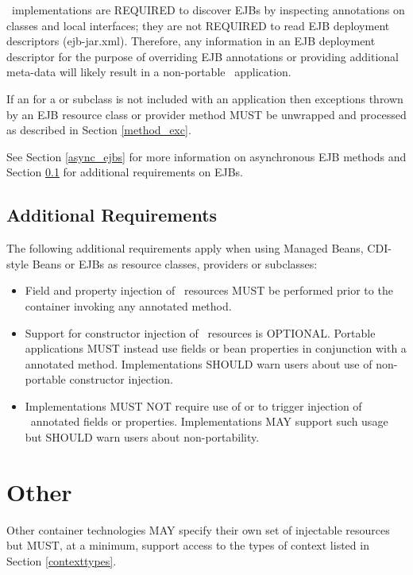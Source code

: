 \jaxrs\ implementations are REQUIRED to discover EJBs by inspecting annotations on classes and local interfaces; they are not REQUIRED to read EJB deployment descriptors (ejb-jar.xml). Therefore, any information in an EJB deployment descriptor for the purpose of overriding EJB annotations or providing additional meta-data will likely result in a non-portable \jaxrs\ application. 

If an  for a  or subclass is not included with an application then exceptions thrown by an EJB resource class or provider method MUST be unwrapped and processed as described in Section \ref{method_exc}. 

See Section \ref{async_ejbs} for more information on asynchronous EJB methods and Section \ref{additional_reqs} for additional requirements on EJBs.

\subsection{Additional Requirements}
\label{additional_reqs}

The following additional requirements apply when using Managed Beans, CDI-style Beans or EJBs as resource classes, providers or  subclasses:

\begin{itemize}
\item Field and property injection of \jaxrs\ resources MUST be performed prior to the container invoking any  annotated method.
\item Support for constructor injection of \jaxrs\ resources is OPTIONAL. Portable applications MUST instead use fields or bean properties in conjunction with a  annotated method. Implementations SHOULD warn users about use of non-portable constructor injection.
\item Implementations MUST NOT require use of  or  to trigger injection of \jaxrs\ annotated fields or properties. Implementations MAY support such usage but SHOULD warn users about non-portability.
\end{itemize}

\section{Other}

Other container technologies MAY specify their own set of injectable resources but MUST, at a minimum, support access to the types of context listed in Section \ref{contexttypes}.
